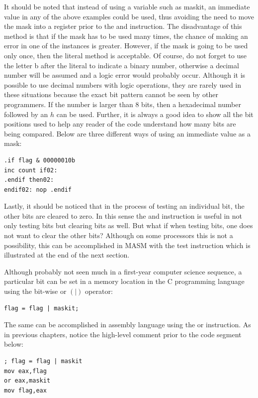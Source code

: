 \documentclass[10pt]{article}
\begin{document}
It should be noted that instead of using a variable such as maskit, an immediate value in any of the above examples could be used, thus avoiding the need to move the mask into a register prior to the and instruction. The disadvantage of this method is that if the mask has to be used many times, the chance of making an error in one of the instances is greater. However, if the mask is going to be used only once, then the literal method is acceptable. Of course, do not forget to use the letter b after the literal to indicate a binary number, otherwise a decimal number will be assumed and a logic error would probably occur. Although it is possible to use decimal numbers with logic operations, they are rarely used in these situations because the exact bit pattern cannot be seen by other programmers. If the number is larger than 8 bits, then a hexadecimal number followed by an $h$ can be used. Further, it is always a good idea to show all the bit positions used to help any reader of the code understand how many bits are being compared. Below are three different ways of using an immediate value as a mask:

\begin{verbatim}
.if flag & 00000010b
inc count if02:
.endif then02:
endif02: nop .endif
\end{verbatim}

Lastly, it should be noticed that in the process of testing an individual bit, the other bits are cleared to zero. In this sense the and instruction is useful in not only testing bits but clearing bits as well. But what if when testing bits, one does not want to clear the other bits? Although on some processors this is not a possibility, this can be accomplished in MASM with the test instruction which is illustrated at the end of the next section.

Although probably not seen much in a first-year computer science sequence, a particular bit can be set in a memory location in the C programming language using the bit-wise or $(\mid)$ operator:

\begin{verbatim}
flag = flag | maskit;
\end{verbatim}

The same can be accomplished in assembly language using the or instruction. As in previous chapters, notice the high-level comment prior to the code segment below:

\begin{verbatim}
; flag = flag | maskit
mov eax,flag
or eax,maskit
mov flag,eax
\end{verbatim}
\end{document}
